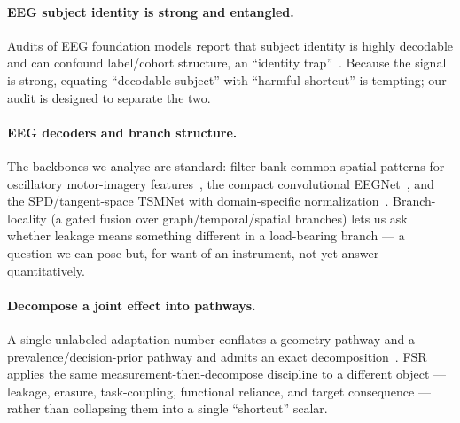 \paragraph{EEG subject identity is strong and entangled.} Audits of EEG foundation models report that
subject identity is highly decodable and can confound label/cohort structure, an ``identity
trap''~\citep{lin2026identitytrap}. Because the signal is strong, equating ``decodable subject'' with
``harmful shortcut'' is tempting; our audit is designed to separate the two.

\paragraph{EEG decoders and branch structure.} The backbones we analyse are standard: filter-bank
common spatial patterns for oscillatory motor-imagery features~\citep{ang2012fbcsp}, the compact
convolutional EEGNet~\citep{lawhern2018eegnet}, and the SPD/tangent-space TSMNet with domain-specific
normalization~\citep{kobler2022tsmnet}. Branch-locality (a gated fusion over graph/temporal/spatial
branches) lets us ask whether leakage means something different in a load-bearing branch --- a question
we can pose but, for want of an instrument, not yet answer quantitatively.

\paragraph{Decompose a joint effect into pathways.} A single unlabeled adaptation number conflates a
geometry pathway and a prevalence/decision-prior pathway and admits an exact
decomposition~\citep{prior_decoupled_tta_internal}. FSR applies the same measurement-then-decompose
discipline to a different object --- leakage, erasure, task-coupling, functional reliance, and target
consequence --- rather than collapsing them into a single ``shortcut'' scalar.
